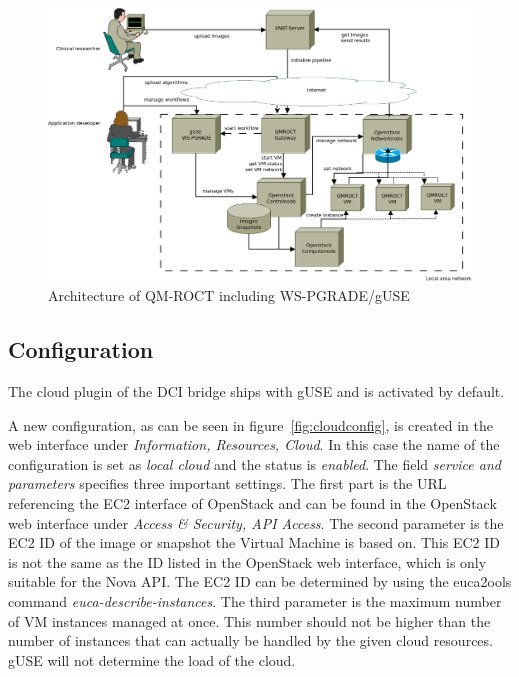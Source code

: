 \begin{figure}%
                \centering
                \includegraphics[width=2.0\columnwidth]{images/somno-architecture.png}
                \caption{Architecture of QM-ROCT \cite{wu14} including WS-PGRADE/gUSE}
                \label{fig:architecture}
\end{figure}

\subsection{Configuration}\label{configuration}

The cloud plugin of the DCI bridge ships with gUSE and is activated by default.

A new configuration, as can be seen in figure~\ref{fig:cloudconfig}, is created in the web interface under \textit{Information, Resources, Cloud}.
In this case the name of the configuration is set as \textit{local cloud} and the status is \textit{enabled}. The field \textit{service and parameters} specifies three important settings.
The first part is the URL referencing the EC2 interface of OpenStack and can be found in the OpenStack web interface under \textit{Access \& Security, API Access}.
The second parameter is the EC2 ID of the image or snapshot the Virtual Machine is based on.
This EC2 ID is not the same as the ID listed in the OpenStack web interface, which is only suitable for the Nova API.
The EC2 ID can be determined by using the euca2ools command \textit{euca-describe-instances}.
The third parameter is the maximum number of VM instances managed at once.
This number should not be higher than the number of instances that can actually be handled by the given cloud resources.
gUSE will not determine the load of the cloud.

